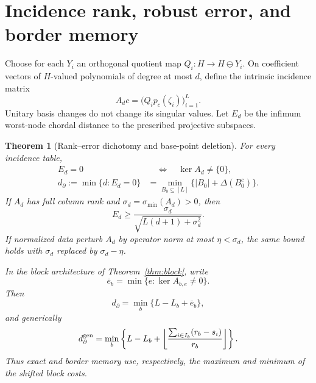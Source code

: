 \documentclass[11pt]{article}
\newtheorem{theorem}{Theorem}[section]
\theoremstyle{definition}\newtheorem{definition}[theorem]{Definition}\newtheorem{example}[theorem]{Example}
\theoremstyle{remark}\newtheorem{remark}[theorem]{Remark}\newtheorem{limitation}[theorem]{Limitation}
\begin{document}
\section{Incidence rank, robust error, and border memory}

Choose for each $Y_i$ an orthogonal quotient map
$Q_i:H\to H\ominus Y_i$.  On coefficient vectors of $H$-valued polynomials
of degree at most $d$, define the intrinsic incidence matrix
\begin{equation}\label{eq:Ad}
 A_d c=\bigl(Q_i p_c(\zeta_i)\bigr)_{i=1}^L.
\end{equation}
Unitary basis changes do not change its singular values.  Let $E_d$ be the
infimum worst-node chordal distance to the prescribed projective subspaces.

\begin{theorem}[Rank--error dichotomy and base-point deletion]\label{thm:global-border}
For every incidence table,
\begin{align}
 E_d=0&\quad\Longleftrightarrow\quad\ker A_d\ne\{0\},
                                                        \label{eq:rank-border}\\
 d_\partial:=\min\{d:E_d=0\}
 &=\min_{B_0\subseteq[L]}\bigl\{|B_0|+\Delta(B_0^c)\bigr\}.
                                                        \label{eq:delete}
\end{align}
If $A_d$ has full column rank and $\sigma_d=\sigma_{\min}(A_d)>0$, then
\begin{equation}\label{eq:global-error}
 E_d\ge\boxed{\frac{\sigma_d}
                    {\sqrt{L(d+1)+\sigma_d^2}}}.
\end{equation}
If normalized data perturb $A_d$ by operator norm at most $\eta<\sigma_d$,
the same bound holds with $\sigma_d$ replaced by $\sigma_d-\eta$.

In the block architecture of Theorem~\ref{thm:block}, write
\[
 \bar e_b=\min\{e:\ker A_{b,e}\ne0\}.
\]
Then
\begin{equation}\label{eq:border-min}
 d_\partial=\min_b\{L-L_b+\bar e_b\},
\end{equation}
and generically
\begin{equation}\label{eq:border-generic}
 d_\partial^{\rm gen}=\min_b\left\{L-L_b+\left\lfloor
              \frac{\sum_{i\in I_b}(r_b-s_i)}{r_b}\right\rfloor\right\}.
\end{equation}
Thus exact and border memory use, respectively, the maximum and minimum of the
shifted block costs.
\end{theorem}
\end{document}
